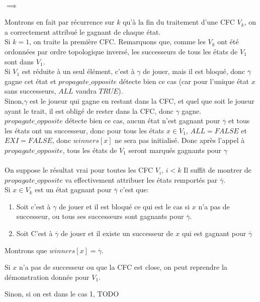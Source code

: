 \documentclass[10pt,a4paper]{article}
\begin{document}
\paragraph{$\implies$}
Montrons en fait par récurrence sur $k$ qu'à la fin du traitement d'une CFC $V_k$, on a correctement attribué le gagnant de chaque état. \\
Si $k = 1$, on traite la première CFC. Remarquons que, comme les $V_k$ ont été ordonnées par ordre topologique inversé, les successeurs de tous les états de $V_1$  sont dans $V_1$.\\
Si $V_1$ est réduite à un seul élément, c'est à $\gamma$ de jouer, mais il est bloqué, donc $\overline{\gamma}$ gagne cet état et $propagate\_opposite$ détecte bien ce cas (car pour l'unique état $x$ sans successeurs, $ALL$ vaudra $TRUE$).\\
Sinon,$\gamma$ est le joueur qui gagne en restant dans la CFC, et quel que soit le joueur ayant le trait, il est obligé de rester dans la CFC, donc $\gamma$ gagne. $propagate\_opposite$ détecte bien ce cas, aucun état n'est gagnant pour $\overline{\gamma}$ et tous les états ont un successeur, donc pour tous les états $x \in V_1$, $ALL = FALSE$ et $EXI = FALSE$, donc $winners[x]$ ne sera pas initialisé. Donc après l'appel à $propagate\_opposite$, tous les états de $V_1$ seront marqués gagnants pour $\gamma$
\\
\\
On suppose le résultat vrai pour toutes les CFC $V_i$, $i < k$
Il suffit de montrer de $propagate\_opposite$ va effectivement attribuer les états remportés par $\overline{\gamma}$.\\
Si $x \in V_k$ est un état gagnant pour $\overline{\gamma}$ c'est que:
\begin{enumerate}
	\item Soit c'est à $\gamma$ de jouer et il est bloqué ce qui est le cas si $x$ n'a pas de successeur, ou tous ses successeurs sont gagnants pour $\overline{\gamma}$.
	\item Soit C'est à $\overline{\gamma}$ de jouer et il existe un successeur de $x$ qui est gagnant pour $\overline{\gamma}$
\end{enumerate}
Montrons que $winners[x] = \overline{\gamma}$.

Si $x$ n'a pas de successeur ou que la CFC est close, on peut reprendre la démonstration donnée pour $V_1$.

Sinon, si on est dans le cas 1, TODO
\end{document}

